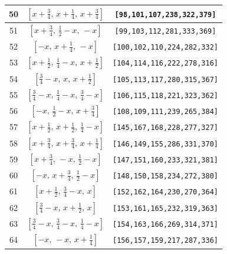 \documentclass[fleqn,8pt]{jsarticle}
\begin{document}
\begin{longtable}{ccc}
50 & $\left[ x + \frac{3}{4},\, x + \frac{1}{4},\, x + \frac{3}{4} \right]$ & {\tt [98,101,107,238,322,379]} \\ \hline
51 & $\left[ x + \frac{3}{4},\, \frac{1}{2} - x,\, - x \right]$ & {\tt [99,103,112,281,333,369]} \\ \hline
52 & $\left[ - x,\, x + \frac{1}{4},\, - x \right]$ & {\tt [100,102,110,224,282,332]} \\ \hline
53 & $\left[ x + \frac{1}{2},\, \frac{1}{4} - x,\, x + \frac{1}{2} \right]$ & {\tt [104,114,116,222,278,316]} \\ \hline
54 & $\left[ \frac{3}{4} - x,\, x,\, x + \frac{1}{2} \right]$ & {\tt [105,113,117,280,315,367]} \\ \hline
55 & $\left[ \frac{3}{4} - x,\, \frac{1}{4} - x,\, \frac{3}{4} - x \right]$ & {\tt [106,115,118,221,323,362]} \\ \hline
56 & $\left[ - x,\, \frac{1}{2} - x,\, x + \frac{3}{4} \right]$ & {\tt [108,109,111,239,265,384]} \\ \hline
57 & $\left[ x + \frac{1}{2},\, x + \frac{1}{2},\, \frac{1}{4} - x \right]$ & {\tt [145,167,168,228,277,327]} \\ \hline
58 & $\left[ x + \frac{3}{4},\, x + \frac{3}{4},\, x + \frac{1}{4} \right]$ & {\tt [146,149,155,286,331,370]} \\ \hline
59 & $\left[ x + \frac{3}{4},\, - x,\, \frac{1}{2} - x \right]$ & {\tt [147,151,160,233,321,381]} \\ \hline
60 & $\left[ - x,\, x + \frac{3}{4},\, \frac{1}{2} - x \right]$ & {\tt [148,150,158,234,272,380]} \\ \hline
61 & $\left[ x + \frac{1}{2},\, \frac{3}{4} - x,\, x \right]$ & {\tt [152,162,164,230,270,364]} \\ \hline
62 & $\left[ \frac{3}{4} - x,\, x + \frac{1}{2},\, x \right]$ & {\tt [153,161,165,232,319,363]} \\ \hline
63 & $\left[ \frac{3}{4} - x,\, \frac{3}{4} - x,\, \frac{1}{4} - x \right]$ & {\tt [154,163,166,269,314,371]} \\ \hline
64 & $\left[ - x,\, - x,\, x + \frac{1}{4} \right]$ & {\tt [156,157,159,217,287,336]} \\
\end{longtable}
\renewcommand{\arraystretch}{1.2}
\end{document}

